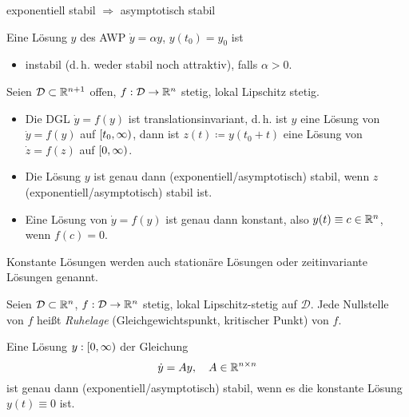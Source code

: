 \documentclass{cheat-sheet}
\newcommand{\D}{\mathcal{D}}
\begin{document}
\begin{bem}
  exponentiell stabil $\Rightarrow$ asymptotisch stabil
\end{bem}

\begin{bsp}
  Eine Lösung $y$ des AWP $\dot{y} = \alpha y$, $y(t_0) = y_0$ ist
  \begin{itemize}
    \item instabil (d.\,h. weder stabil noch attraktiv), falls $\alpha > 0$.
  \end{itemize}
\end{bsp}


\begin{satz}
  Seien $\D \subset \R^{n+1}$ offen, $f : \D \to \R^n$ stetig, lokal Lipschitz stetig.
  \begin{itemize}
    \item Die DGL $\dot{y} = f(y)$ ist translationsinvariant, d.\,h. ist $y$ eine Lösung von $\dot{y} = f(y)$ auf $\left[ t_0, \infty \right)$, dann ist $z(t) \coloneqq y(t_0 + t)$ eine Lösung von $\dot{z} = f(z)$ auf $\left[ 0, \infty \right)$.
    \item Die Lösung $y$ ist genau dann (exponentiell/asymptotisch) stabil, wenn $z$ (exponentiell/asymptotisch) stabil ist.
    \item Eine Lösung von $\dot{y} = f(y)$ ist genau dann konstant, also $y(t) \equiv c \in \mathbb{R}^n$, wenn $f(c) = 0$.
  \end{itemize}
\end{satz}

\begin{sprech}
  Konstante Lösungen werden auch stationäre Lösungen oder zeitinvariante Lösungen genannt.
\end{sprech}

\begin{defn}
  Seien $\D \subset \R^n$, $f : \D \to \R^n$ stetig, lokal Lipschitz-stetig auf $\D$. Jede Nullstelle von $f$ heißt \emph{Ruhelage} (Gleichgewichtspunkt, kritischer Punkt) von $f$.
\end{defn}


\begin{bem}
  Eine Lösung $y : \left[ 0, \infty \right)$ der Gleichung
  \[ \dot{y} = A y, \quad A \in \mathbb{R}^{n \times n} \]
  ist genau dann (exponentiell/asymptotisch) stabil, wenn es die konstante Lösung $y(t) \equiv 0$ ist.
\end{bem}
\end{document}
